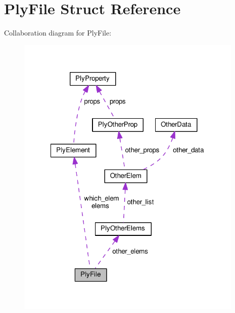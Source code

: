 \hypertarget{structPlyFile}{\section{Ply\-File Struct Reference}
\label{structPlyFile}
}


Collaboration diagram for Ply\-File\-:\nopagebreak
\begin{figure}[H]
\begin{center}
\leavevmode
\includegraphics[width=307pt]{structPlyFile__coll__graph}
\end{center}
\end{figure}
